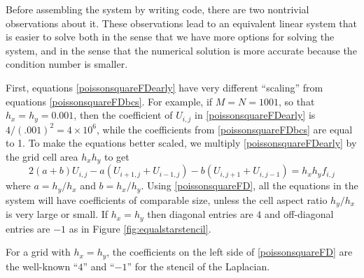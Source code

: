 \medskip
Before assembling the system by writing \PETSc code, there are two nontrivial observations about it.  These observations lead to an equivalent linear system that is easier to solve both in the sense that we have more options for solving the system, and in the sense that the numerical solution is more accurate because the condition number is smaller.

First, equations \eqref{poissonsquareFDearly} have very different ``scaling'' from equations \eqref{poissonsquareFDbcs}.  For example, if $M=N=1001$, so that $h_x=h_y=0.001$, then the coefficient of $U_{i,j}$ in \eqref{poissonsquareFDearly} is $4/(.001)^2 = 4 \times 10^6$, while the coefficients from \eqref{poissonsquareFDbcs} are equal to 1.  To make the equations better scaled, we multiply \eqref{poissonsquareFDearly} by the grid cell area $h_x h_y$ to get
\begin{equation}
2 (a + b) U_{i,j} - a \left(U_{i+1,j} + U_{i-1,j}\right) - b \left(U_{i,j+1} + U_{i,j-1}\right) = h_x h_y f_{i,j} \label{poissonsquareFD}
\end{equation}
where $a=h_y/h_x$ and $b=h_x/h_y$.  Using \eqref{poissonsquareFD}, all the equations in the system will have coefficients of comparable size, unless the cell aspect ratio $h_y/h_x$ is very large or small.  If $h_x=h_y$ then diagonal entries are $4$ and off-diagonal entries are $-1$ as in Figure \ref{fig:equalstarstencil}.

\begin{marginfigure}
\caption{For a grid with $h_x=h_y$, the coefficients on the left side of \eqref{poissonsquareFD} are the well-known ``$4$'' and ``$-1$'' for the stencil of the Laplacian.}
\label{fig:equalstarstencil}
\end{marginfigure}

